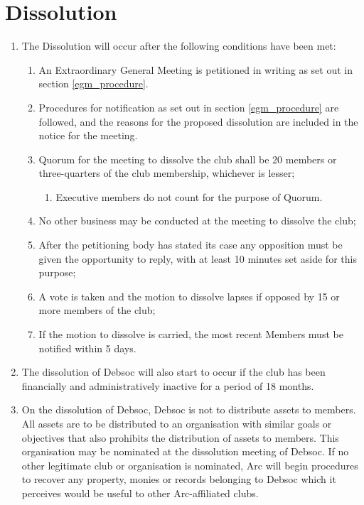 \newpage
\section{Dissolution}

\begin{enumerate}
\item The Dissolution will occur after the following conditions have been met:
  \begin{enumerate}
  \item An Extraordinary General Meeting is petitioned in writing as set out in section \ref{egm_procedure}.
  \item Procedures for notification as set out in section \ref{egm_procedure} are followed, and the reasons for the proposed dissolution are included in the notice for the meeting.
  \item Quorum for the meeting to dissolve the club shall be 20 members or three-quarters of the club membership, whichever is lesser;
    \begin{enumerate}
    \item Executive members do not count for the purpose of Quorum.
    \end{enumerate}
  \item No other business may be conducted at the meeting to dissolve the club;
  \item After the petitioning body has stated its case any opposition must be given the opportunity to reply, with at least 10 minutes set aside for this purpose;
  \item A vote is taken and the motion to dissolve lapses if opposed by 15 or more members of the club;
  \item If the motion to dissolve is carried, the most recent Members must be notified within 5 days.
  \end{enumerate}
\item The dissolution of Debsoc will also start to occur if the club has been financially and administratively inactive for a period of 18 months.
\item On the dissolution of Debsoc, Debsoc is not to distribute assets to members. All assets are to be distributed to an organisation with similar goals or objectives that also prohibits the distribution of assets to members. This organisation may be nominated at the dissolution meeting of Debsoc. If no other legitimate club or organisation is nominated, Arc will begin procedures to recover any property, monies or records belonging to Debsoc which it perceives would be useful to other Arc-affiliated clubs.
\end{enumerate}
